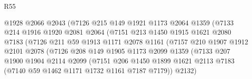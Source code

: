 \begin{lexlean}{R55}
\begin{coremodule}
                              @1928
                              @2066
                              @2043
                              (@7126
                                @215
                                @149
                                @1921
                                @1173
                                @2064
                                @1359
                                (@7133
                                  @214
                                  @1916
                                  @1920
                                  @2081
                                  @2064
                                  (@7151
                                    @213
                                    @1450
                                    @1915
                                    @1621
                                    @2080
                                    @7183
                                    (@7126
                                      @211
                                      @59
                                      @1913
                                      @1171
                                      @2078
                                      @1161
                                      (@7157
                                        @210
                                        @1907
                                        @1912
                                        @2101
                                        @2078
                                        (@7126
                                          @208
                                          @149
                                          @1905
                                          @1173
                                          @2099
                                          @1359
                                          (@7133
                                            @207
                                            @1900
                                            @1904
                                            @2114
                                            @2099
                                            (@7151
                                              @206
                                              @1450
                                              @1899
                                              @1621
                                              @2113
                                              @7183
                                              (@7140 @59 @1462 @1171 @1732 @1161 @7187 @7179))
                                            @2132)

\end{coremodule}
\end{lexlean}
